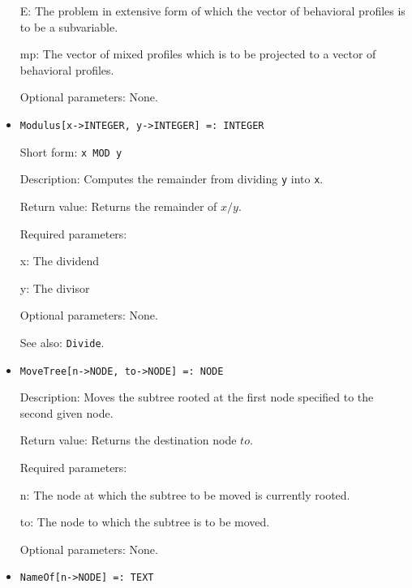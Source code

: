 \begin{itemize}
\bd
\item
[E:] The problem in extensive form of which the vector of behavioral
profiles is to be a subvariable.
\item
[mp:] The vector of mixed profiles which is to be projected to a
vector of behavioral profiles.
\ed

\item
[Optional parameters:] None.
\ed

\item
\protect \large \begin{verbatim}
Modulus[x->INTEGER, y->INTEGER] =: INTEGER
\end{verbatim}\normalsize

\bd
\item
[Short form:] \verb+x MOD y+
\item
[Description:] Computes the remainder from dividing \verb+y+ into \verb+x+.
\item
[Return value:] Returns the remainder of $x / y$.
\item
[Required parameters:]\hfil\null

\bd
\item
[x:] The dividend
\item
[y:] The divisor
\ed

\item
[Optional parameters:] None.
\item
[See also:] \verb+Divide+.
\ed


\item
\protect \large \begin{verbatim}
MoveTree[n->NODE, to->NODE] =: NODE
\end{verbatim}\normalsize

\bd
\item
[Description:] Moves the subtree rooted at the first node specified to
the second given node.
\item
[Return value:] Returns the destination node $to$.
\item
[Required parameters:]\hfil\null
	  
\bd
\item
[n:] The node at which the subtree to be moved is currently rooted.
\item
[to:] The node to which the subtree is to be moved.
\ed

\item
[Optional parameters:] None.
\ed


\item
\protect \large \begin{verbatim}
NameOf[n->NODE] =: TEXT
\end{verbatim}\normalsize


\end{itemize}
